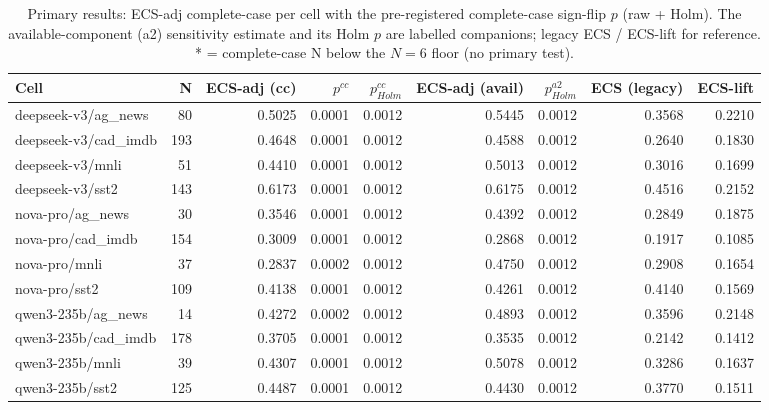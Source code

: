 \begin{table}[t]
\centering
\caption{Primary results: ECS-adj complete-case per cell with the pre-registered complete-case sign-flip $p$ (raw + Holm). The available-component (a2) sensitivity estimate and its Holm $p$ are labelled companions; legacy ECS / ECS-lift for reference. * = complete-case N below the $N{=}6$ floor (no primary test).}
\label{tab:primary}
\begin{tabular}{lrrrrrrrr}
\toprule
Cell & N & ECS-adj (cc) & $p^{cc}$ & $p^{cc}_{Holm}$ & ECS-adj (avail) & $p^{a2}_{Holm}$ & ECS (legacy) & ECS-lift \\
\midrule
deepseek-v3/ag_news & 80 & 0.5025 & 0.0001 & 0.0012 & 0.5445 & 0.0012 & 0.3568 & 0.2210 \\
deepseek-v3/cad_imdb & 193 & 0.4648 & 0.0001 & 0.0012 & 0.4588 & 0.0012 & 0.2640 & 0.1830 \\
deepseek-v3/mnli & 51 & 0.4410 & 0.0001 & 0.0012 & 0.5013 & 0.0012 & 0.3016 & 0.1699 \\
deepseek-v3/sst2 & 143 & 0.6173 & 0.0001 & 0.0012 & 0.6175 & 0.0012 & 0.4516 & 0.2152 \\
nova-pro/ag_news & 30 & 0.3546 & 0.0001 & 0.0012 & 0.4392 & 0.0012 & 0.2849 & 0.1875 \\
nova-pro/cad_imdb & 154 & 0.3009 & 0.0001 & 0.0012 & 0.2868 & 0.0012 & 0.1917 & 0.1085 \\
nova-pro/mnli & 37 & 0.2837 & 0.0002 & 0.0012 & 0.4750 & 0.0012 & 0.2908 & 0.1654 \\
nova-pro/sst2 & 109 & 0.4138 & 0.0001 & 0.0012 & 0.4261 & 0.0012 & 0.4140 & 0.1569 \\
qwen3-235b/ag_news & 14 & 0.4272 & 0.0002 & 0.0012 & 0.4893 & 0.0012 & 0.3596 & 0.2148 \\
qwen3-235b/cad_imdb & 178 & 0.3705 & 0.0001 & 0.0012 & 0.3535 & 0.0012 & 0.2142 & 0.1412 \\
qwen3-235b/mnli & 39 & 0.4307 & 0.0001 & 0.0012 & 0.5078 & 0.0012 & 0.3286 & 0.1637 \\
qwen3-235b/sst2 & 125 & 0.4487 & 0.0001 & 0.0012 & 0.4430 & 0.0012 & 0.3770 & 0.1511 \\
\bottomrule
\end{tabular}
\end{table}
